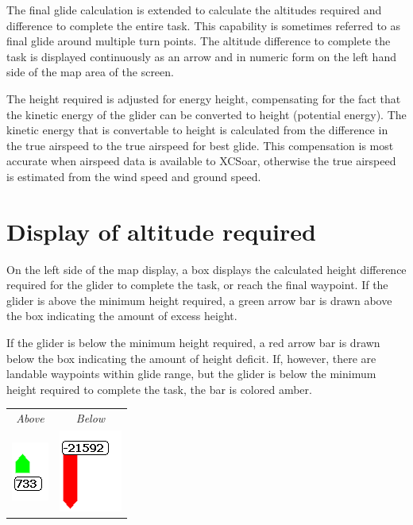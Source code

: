 \documentclass[a4paper,12pt]{refrep}
\begin{document}
The final glide calculation is extended to calculate the altitudes
required and difference to complete the entire task.  This capability
is sometimes referred to as final glide around multiple turn points.
The altitude difference to complete the task is displayed continuously
as an arrow and in numeric form on the left hand side of the map area
of the screen.

The height required is adjusted for energy height, compensating for
the fact that the kinetic energy of the glider can be converted to
height (potential energy).  The kinetic energy that is convertable to
height is calculated from the difference in the true airspeed to the
true airspeed for best glide.  This compensation is most accurate when
airspeed data is available to XCSoar, otherwise the true airspeed is
estimated from the wind speed and ground speed.

\section{Display of altitude required}

On the left side of the map display, a box displays the calculated
height difference required for the glider to complete the task, or
reach the final waypoint.  If the glider is above the minimum height
required, a green arrow bar is drawn above the box indicating the
amount of excess height.

If the glider is below the minimum height required, a red arrow bar is
drawn below the box indicating the amount of height deficit.  If,
however, there are landable waypoints within glide range, but the
glider is below the minimum height required to complete the task, the
bar is colored amber.

\begin{center}
\begin{tabular}{c c}
{\it Above} & {\it Below} \\
\includegraphics[angle=0,width=0.15\linewidth,keepaspectratio='true']{figures/cut-fg-above.png} &
\includegraphics[angle=0,width=0.2\linewidth,keepaspectratio='true']{figures/cut-fg-below.png} \\
\end{tabular}
\end{center}
\end{document}
